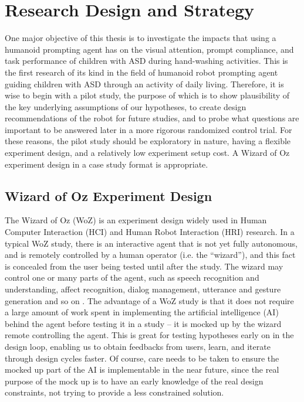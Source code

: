 \documentclass{ut-thesis}
\begin{document}
\section{Research Design and Strategy}
One major objective of this thesis is to investigate the impacts that using a humanoid prompting agent has on the visual attention, prompt compliance, and task performance of children with ASD during hand-washing activities.  This is the first research of its kind in the field of humanoid robot prompting agent guiding children with ASD through an activity of daily living.  Therefore, it is wise to begin with a pilot study, the purpose of which is to show plausibility of the key underlying assumptions of our hypotheses, to create design recommendations of the robot for future studies, and to probe what questions are important to be answered later in a more rigorous randomized control trial.  For these reasons, the pilot study should be exploratory in nature, having a flexible experiment design, and a relatively low experiment setup cost.  A Wizard of Oz experiment design in a case study format is appropriate.

\subsection{Wizard of Oz Experiment Design}
The Wizard of Oz (WoZ) is an experiment design widely used in Human Computer Interaction (HCI) and Human Robot Interaction (HRI) research.  In a typical WoZ study, there is an interactive agent that is not yet fully autonomous, and is remotely controlled by a human operator (i.e. the ``wizard''), and this fact is concealed from the user being tested until after the study.  The wizard may control one or many parts of the agent, such as speech recognition and understanding, affect recognition, dialog management, utterance and gesture generation and so on \cite{bhargava2013demonstration}.  The advantage of a WoZ study is that it does not require a large amount of work spent in implementing the artificial intelligence (AI) behind the agent before testing it in a study -- it is mocked up by the wizard remote controlling the agent.  This is great for testing hypotheses early on in the design loop, enabling us to obtain feedbacks from users, learn, and iterate through design cycles faster.  Of course, care needs to be taken to ensure the mocked up part of the AI is implementable in the near future, since the real purpose of the mock up is to have an early knowledge of the real design constraints, not trying to provide a less constrained solution.
\end{document}
